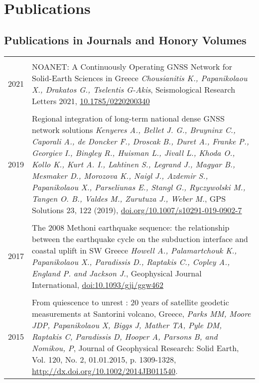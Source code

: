 \documentclass[9pt]{extarticle} %
\begin{document}
\section{Publications}
\medskip
%
\subsection*{Publications in Journals and Honory Volumes}
%
\begin{longtable}{r|p{14cm}}
%
\multicolumn{2}{c}{} \\
  \textsc{2021}
%
  & NOANET: A Continuously Operating GNSS Network for Solid-Earth Sciences in Greece
  \emph{Chousianitis K., Papanikolaou X., Drakatos G., Tselentis G-Akis}, Seismological Research Letters 2021, \href{https://doi.org/10.1785/0220200340}{10.1785/0220200340}\\
\multicolumn{2}{c}{} \\
  \textsc{2019}
%
  & Regional integration of long-term national dense GNSS network solutions
  \emph{Kenyeres A., Bellet J. G., Bruyninx C., Caporali A., de Doncker F., Droscak B., Duret A., Franke P., Georgiev I., Bingley R., Huisman L., Jivall L., Khoda O., Kollo K., Kurt A. I., Lahtinen S., Legrand J., Magyar B., Mesmaker D., Morozova K., Naigl J., Azdemir S., Papanikolaou X., Parseliunas E., Stangl G., Ryczywolski M., Tangen O. B., Valdes M., Zurutuza J., Weber M.}, GPS Solutions 23, 122 (2019), \href{https://doi.org/10.1007/s10291-019-0902-7}{doi.org/10.1007/s10291-019-0902-7}\\
%
\multicolumn{2}{c}{} \\
  \textsc{2017}
%
  & The 2008 Methoni earthquake sequence: the relationship between the earthquake cycle on the subduction interface and coastal uplift in SW Greece
  \emph{Howell A., Palamartchouk K., Papanikolaou X., Paradissis D., Raptakis C., Copley A., England P. and Jackson J.}, Geophysical Journal International, \href{https://doi.org/10.1093/gji/ggw462}{doi:10.1093/gji/ggw462}\\
%
\multicolumn{2}{c}{} \\
  \textsc{2015}
%
  & From quiescence to unrest : 20 years of satellite geodetic measurements at Santorini volcano, Greece,
  \emph{Parks MM, Moore JDP, Papanikolaou X, Biggs J, Mather TA, Pyle DM, Raptakis C, Paradissis D, Hooper A, Parsons B, and Nomikou, P}, Journal of Geophysical Research: Solid Earth, Vol. 120, No. 2, 01.01.2015, p. 1309-1328, \href{http://dx.doi.org/10.1002/2014JB011540}{http://dx.doi.org/10.1002/2014JB011540}.\\

\end{longtable}
\end{document}
